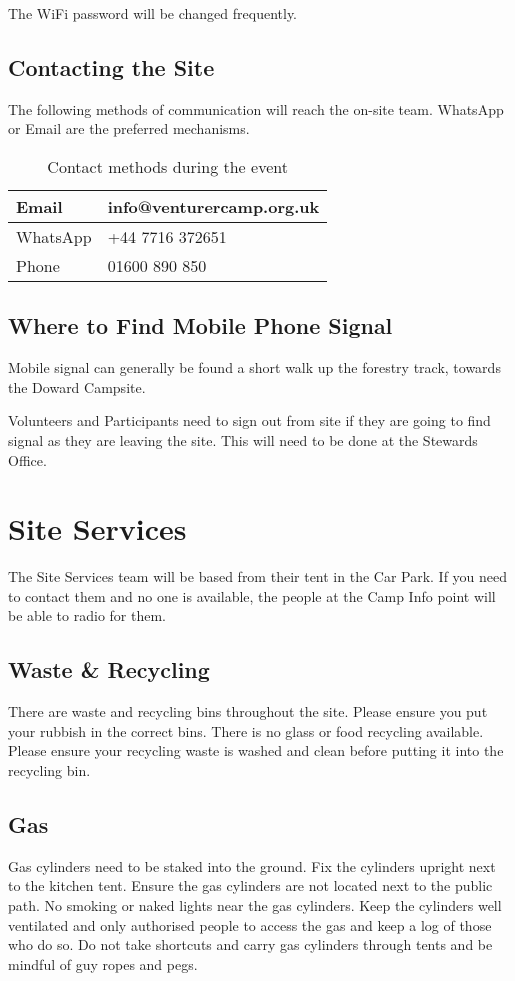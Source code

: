 \documentclass[a4paper, 11pt]{report}
\begin{document}
The WiFi password will be changed frequently.

\section{Contacting the Site}
The following methods of communication will reach the on-site team. WhatsApp or Email are the preferred mechanisms.
\begin{table}[H]
    \centering
    \begin{tabular}{p{} p{}}
        \hline
        Email & info@venturercamp.org.uk\\
        \hline
        WhatsApp & +44 7716 372651\\
        \hline
        Phone & 01600 890 850\\
        \hline
    \end{tabular}
    \caption{Contact methods during the event}
\end{table}

\section{Where to Find Mobile Phone Signal}
Mobile signal can generally be found a short walk up the forestry track, towards the Doward Campsite.\nl

Volunteers and Participants need to sign out from site if they are going to find signal as they are leaving the site. This will need to be done at the Stewards Office.

\chapter{Site Services}
The Site Services team will be based from their tent in the Car Park. If you need to contact them and no one is available, the people at the Camp Info point will be able to radio for them. 

\section{Waste \& Recycling}
There are waste and recycling bins throughout the site. Please ensure you put your rubbish in the correct bins. There is no glass or food recycling available. Please ensure your recycling waste is washed and clean before putting it into the recycling bin. 

\section{Gas}
Gas cylinders need to be staked into the ground. Fix the cylinders upright next to the kitchen tent. Ensure the gas cylinders are not located next to the public path. No smoking or naked lights near the gas cylinders. Keep the cylinders well ventilated and only authorised people to access the gas and keep a log of those who do so. Do not take shortcuts and carry gas cylinders through tents and be mindful of guy ropes and pegs.\nl
\end{document}
